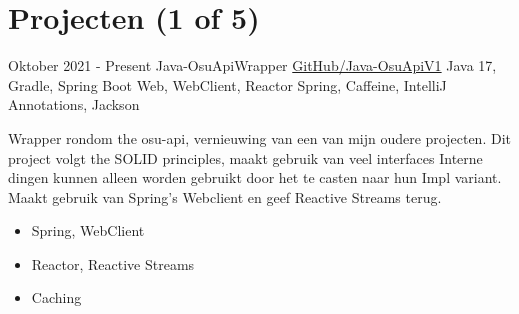 \documentclass[letterpaper]{twentysecondcv} %
\begin{document}
\vspace{6mm}



\section{Projecten (1 of 5)}
\begin{twenty} %
	\twentyitem
    		{Oktober 2021 -}
		{Present}
        		{Java-OsuApiWrapper}
        		{\href{https://github.com/Tais993/Java-OsuApiV1/}{GitHub/Java-OsuApiV1}}
        		{Java 17, Gradle, Spring Boot Web, WebClient, Reactor Spring, Caffeine, IntelliJ Annotations, Jackson}
        		{
        		Wrapper rondom the osu-api, vernieuwing van een van mijn oudere projecten.
        		Dit project volgt the SOLID principles, maakt gebruik van veel interfaces
                Interne dingen kunnen alleen worden gebruikt door het te casten naar hun Impl variant.
                Maakt gebruik van Spring's Webclient en geef Reactive Streams terug.
        		\begin{itemize}
        		    \item Spring, WebClient
        		    \item Reactor, Reactive Streams
        		    \item Caching
                \end{itemize}}\\

\end{twenty}

\newpage

\makesidebarSecond %

\end{document}
